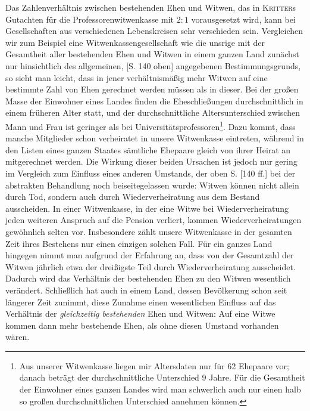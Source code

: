 Das Zahlenverhältnis zwischen bestehenden Ehen und Witwen, das in \textsc{Kritter}s Gutachten für die Professorenwitwenkasse mit \(2:1\) vorausgesetzt wird, kann bei Gesellschaften aus verschiedenen Lebenskreisen sehr verschieden sein. Vergleichen wir zum Beispiel eine Witwenkassengesellschaft wie die unsrige mit der Gesamtheit aller bestehenden Ehen und Witwen in einem ganzen Land zunächst nur hinsichtlich des allgemeinen, [S. 140 oben] angegebenen Bestimmungsgrunds, so sieht man leicht, dass in jener verhältnismäßig mehr Witwen auf eine bestimmte Zahl von Ehen gerechnet werden müssen als in dieser. Bei der großen Masse der Einwohner eines Landes finden die Eheschließungen durchschnittlich in einem früheren Alter statt, und der durchschnittliche Altersunterschied zwischen Mann und Frau ist geringer als bei Universitätsprofessoren\footnote{Aus unserer Witwenkasse liegen mir Altersdaten nur für 62 Ehepaare vor; danach beträgt der durchschnittliche Unterschied 9 Jahre. Für die Gesamtheit der Einwohner eines ganzen Landes wird man schwerlich auch nur einen halb so großen durchschnittlichen Unterschied annehmen können.}. Dazu kommt, dass manche Mitglieder schon verheiratet in unsere Witwenkasse eintreten, während in den Listen eines ganzen Staates sämtliche Ehepaare gleich von ihrer Heirat an mitgerechnet werden. Die Wirkung dieser beiden Ursachen ist jedoch nur gering im Vergleich zum Einfluss eines anderen Umstands, der oben S. [140 ff.] bei der abstrakten Behandlung noch beiseitegelassen wurde: Witwen können nicht allein durch Tod, sondern auch durch Wiederverheiratung aus dem Bestand ausscheiden. In einer Witwenkasse, in der eine Witwe bei Wiederverheiratung jeden weiteren Anspruch auf die Pension verliert, kommen Wiederverheiratungen gewöhnlich selten vor. Insbesondere zählt unsere Witwenkasse in der gesamten Zeit ihres Bestehens nur einen einzigen solchen Fall. Für ein ganzes Land hingegen nimmt man aufgrund der Erfahrung an, dass von der Gesamtzahl der Witwen jährlich etwa der dreißigste Teil durch Wiederverheiratung ausscheidet. Dadurch wird das Verhältnis der bestehenden Ehen zu den Witwen wesentlich verändert. Schließlich hat auch in einem Land, dessen Bevölkerung schon seit längerer Zeit zunimmt, diese Zunahme einen wesentlichen Einfluss auf das Verhältnis der \textit{gleichzeitig bestehenden} Ehen und Witwen: Auf eine Witwe kommen dann mehr bestehende Ehen, als ohne diesen Umstand vorhanden wären.

